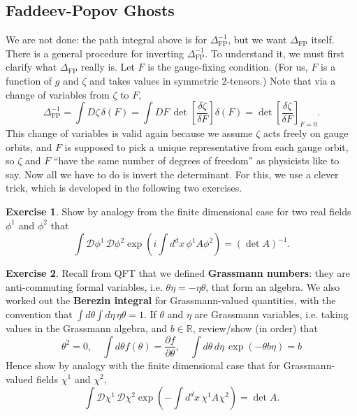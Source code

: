 \documentclass{report}
\theoremstyle{plain}
\theoremstyle{definition}
\newtheorem{exercise}{Exercise}[section]
\theoremstyle{remark}
\newcommand{\bR}{\mathbb{R}}
\newcommand{\cD}{\mathcal{D}}
\newcommand{\detFP}{\Delta_{\text{FP}}}
\newcommand{\pder}[2]{\frac{\partial #1}{\partial #2}}
\newcommand{\fder}[2]{\frac{\delta #1}{\delta #2}}
\begin{document}
\subsection{Faddeev-Popov Ghosts}
\label{chapterone-fpghosts}

We are not done: the path integral above is for $\detFP^{-1}$, but we
want $\detFP$ itself. There is a general procedure for inverting
$\detFP^{-1}$. To understand it, we must first clarify what $\detFP$
really is. Let $F$ is the gauge-fixing condition. (For us, $F$ is a
function of $g$ and $\zeta$ and takes values in symmetric
$2$-tensors.) Note that via a change of variables from $\zeta$ to $F$,
\[ \detFP^{-1} = \int D\zeta \, \delta(F) = \int DF \, \det\left[\fder{\zeta}{F}\right] \delta(F) = \det\left[\fder{\zeta}{F}\right]_{F=0}. \]
This change of variables is valid again because we assume $\zeta$ acts
freely on gauge orbits, and $F$ is supposed to pick a unique
representative from each gauge orbit, so $\zeta$ and $F$ ``have the
same number of degrees of freedom'' as physicists like to say. Now all
we have to do is invert the determinant. For this, we use a clever
trick, which is developed in the following two exercises.

\begin{exercise}
  Show by analogy from the finite dimensional case for two real fields
  $\phi^1$ and $\phi^2$ that
  \[ \int \cD \phi^1 \, \cD \phi^2 \exp\left(i\int d^dx \, \phi^1 A \phi^2\right) = (\det A)^{-1}. \]
\end{exercise}

\begin{exercise}
  Recall from QFT that we defined {\bf Grassmann numbers}: they are
  anti-commuting formal variables, i.e. $\theta \eta = -\eta \theta$,
  that form an algebra. We also worked out the {\bf Berezin integral}
  for Grassmann-valued quantities, with the convention that $\int
  d\theta \int d\eta \, \eta\theta = 1$. If $\theta$ and $\eta$ are
  Grassmann variables, i.e. taking values in the Grassmann algebra,
  and $b \in \bR$, review/show (in order) that
  \[ \theta^2 = 0, \quad \int d\theta f(\theta) = \pder{f}{\theta}, \quad \int d\theta \, d\eta \, \exp(-\theta b\eta) = b \]
  Hence show by analogy with the finite dimensional case that for
  Grassmann-valued fields $\chi^1$ and $\chi^2$,
  \[ \int \cD \chi^1 \, \cD \chi^2 \exp\left(-\int d^dx \, \chi^1 A \chi^2\right) = \det A. \]
\end{exercise}
\end{document}
